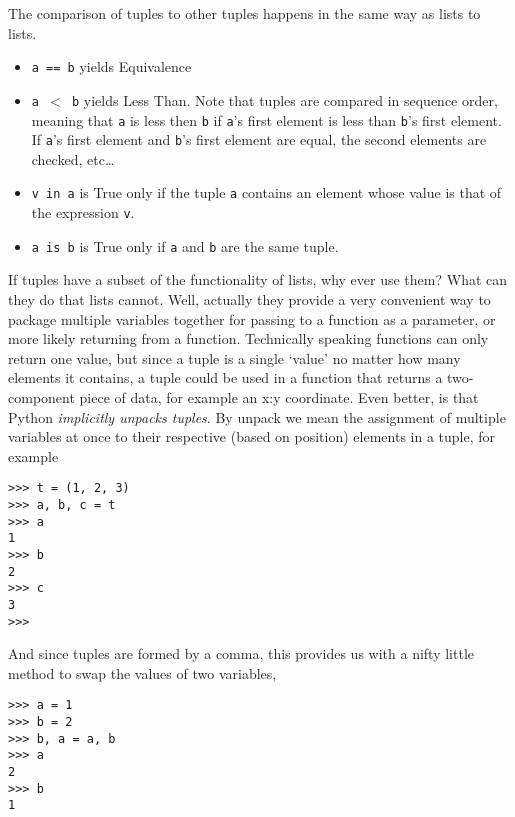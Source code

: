 The comparison of tuples to other tuples happens in the same way as   lists to lists.
\begin{itemize}
	\item 
\texttt{a == b} yields Equivalence
	\item 
\texttt{a $<$ b} yields Less Than. Note that tuples are    compared in sequence order, meaning that \texttt{a} is less then \texttt{b} if    \texttt{a}'s first element is less than \texttt{b}'s first element. If \texttt{a}'s first    element and \texttt{b}'s first element are equal, the second elements are    checked, etc\ldots
	\item 
\texttt{v in a} is True only if the tuple \texttt{a} contains an    element whose value is that of the expression \texttt{v}.
	\item 
\texttt{a is b} is True only if \texttt{a} and \texttt{b} are the same    tuple.
\end{itemize}

If tuples have a subset of the functionality of lists, why ever use   them? What can they do that lists cannot. Well, actually they provide a   very convenient way to package multiple variables together for passing   to a function as a parameter, or more likely returning from a function.   Technically speaking functions can only return one value, but since a   tuple is a single `value' no matter how many elements it contains, a   tuple could be used in a function that returns a two-component piece of   data, for example an x:y coordinate. Even better, is that Python   \textit{implicitly unpacks tuples}. By unpack we mean the   assignment of multiple variables at once to their respective (based on   position) elements in a tuple, for example
\begin{lstlisting}
>>> t = (1, 2, 3)
>>> a, b, c = t
>>> a
1
>>> b
2
>>> c
3
>>>
\end{lstlisting}

And since tuples are formed by a comma, this provides us with a   nifty little method to swap the values of two variables,
\begin{lstlisting}
>>> a = 1
>>> b = 2
>>> b, a = a, b
>>> a
2
>>> b
1
\end{lstlisting}

